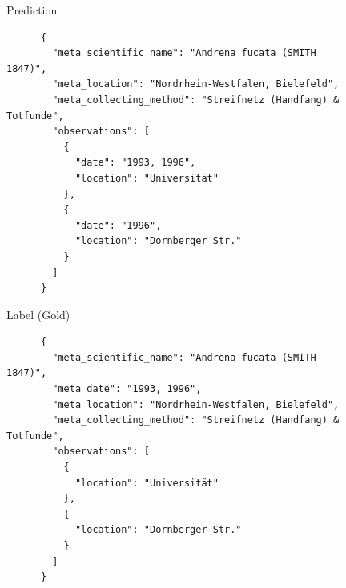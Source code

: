 

\begin{figure}[h]  %
  \noindent

  \begin{minipage}{0.49\textwidth}
      \centering
      Prediction \\ %
      \lstset{language=json}
      \begin{lstlisting}
      {
        "meta_scientific_name": "Andrena fucata (SMITH 1847)",
        "meta_location": "Nordrhein-Westfalen, Bielefeld",
        "meta_collecting_method": "Streifnetz (Handfang) & Totfunde",
        "observations": [
          {
            "date": "1993, 1996",
            "location": "Universität"
          },
          {
            "date": "1996",
            "location": "Dornberger Str."
          }
        ]
      }
      \end{lstlisting}
  \end{minipage}
  \hfill
  \begin{minipage}{0.49\textwidth}
      \centering
      Label (Gold) \\ %
      \lstset{language=json}
      \begin{lstlisting}
      {
        "meta_scientific_name": "Andrena fucata (SMITH 1847)",
        "meta_date": "1993, 1996",
        "meta_location": "Nordrhein-Westfalen, Bielefeld",
        "meta_collecting_method": "Streifnetz (Handfang) & Totfunde",
        "observations": [
          {
            "location": "Universität"
          },
          {
            "location": "Dornberger Str."
          }
        ]
      }
      \end{lstlisting}

  \end{minipage}
  \noindent
  \captionsetup{justification=raggedright,singlelinecheck=false} %
  \vspace{0.5cm} %
\end{figure}
